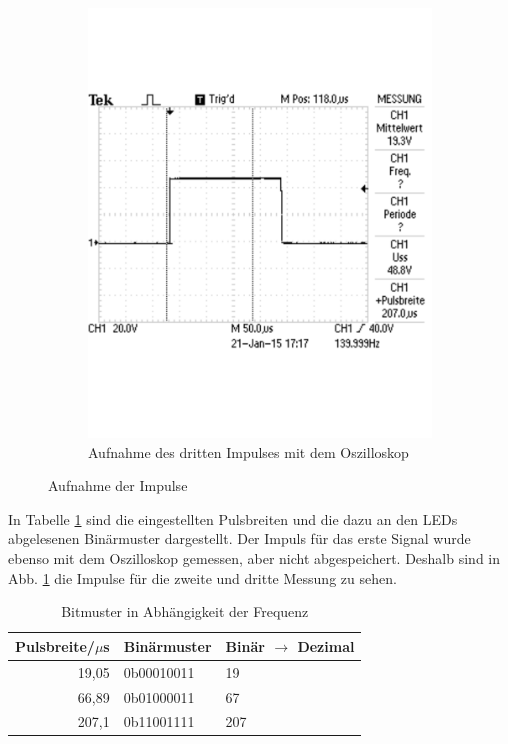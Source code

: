 \documentclass[12pt,a4paper]{article}
\begin{document}
\begin{figure}[H]
\begin{subfigure}[b]{0.45\textwidth}
\includegraphics[scale=0.4]{3_1_207.pdf}
\caption[Aufnahme des 3. Impulses mit dem Oszilloskop]{Aufnahme des dritten Impulses mit dem Oszilloskop}
\end{subfigure}
\caption[Aufnahme der Impulse]{Aufnahme der Impulse}
\label{fig:impulse}
\end{figure}
In Tabelle \ref{tab:span} sind die eingestellten Pulsbreiten und die dazu an den LEDs abgelesenen Binärmuster dargestellt. Der Impuls für das erste Signal wurde ebenso mit dem Oszilloskop gemessen, aber nicht abgespeichert. Deshalb sind in Abb. \ref{fig:impulse} die Impulse für die zweite und dritte Messung zu sehen.
\begin{table}[H]
\begin{center}
\begin{tabular}{|r|l|l|}
	\hline
	\multicolumn{1}{|l|}{Pulsbreite/{\unit{$\mu$s}}} & Binärmuster & Binär $\rightarrow$ Dezimal\\ \hline\hline
	                                           19,05 & 0b00010011  & 19\\ \hline
	                                           66,89 & 0b01000011  & 67\\ \hline
	                                           207,1 & 0b11001111  & 207\\ \hline
\end{tabular}
\end{center}
\caption{Bitmuster in Abhängigkeit der Frequenz}
\label{tab:span}
\end{table}
\end{document}
